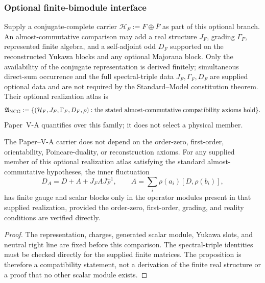 \documentclass[11pt,a4paper]{article}
\begin{document}

\subsubsection{Optional finite-bimodule interface}
\label{p5:subsec:ncg-assumption-discharge}

\begin{definition}
\label{p5:def:born-hopf-finite-spectral-datum}
Supply a conjugate-complete carrier
\(\mathcal H_F:=F\oplus\bar F\) as part of this optional branch.  An
almost-commutative comparison may
add a real structure \(J_F\), grading \(\Gamma_F\), represented finite algebra,
and a self-adjoint odd \(D_F\) supported on the reconstructed Yukawa blocks
and any optional Majorana block.  Only the availability of the conjugate
representation is derived finitely; simultaneous direct-sum occurrence and
the full spectral-triple data \(J_F,\Gamma_F,D_F\) are supplied optional data
and are not required by the Standard--Model constitution theorem.  Their
optional realization atlas
is
\[
\mathfrak A_{\rm NCG}
:=\{(\mathcal H_F,J_F,\Gamma_F,D_F,\rho):
\text{the stated almost-commutative compatibility axioms hold}\}.
\]
Paper~V-A quantifies over this family; it does not select a physical member.
\end{definition}

\begin{proposition}
\label{p5:thm:ncg-finite-input-discharge}
\label{p5:thm:born-hopf-inner-fluctuations}
The Paper--V-A carrier does not depend on the order-zero, first-order,
orientability, Poincare-duality, or reconstruction axioms.  For any supplied member of this optional realization atlas satisfying the standard almost-commutative hypotheses, the inner
fluctuation
\[
D_A=D+A+J_FAJ_F^{-1},
\qquad
A=\sum_i\rho(a_i)[D,\rho(b_i)],
\]
has finite gauge and scalar blocks only in the operator modules present in
that supplied realization, provided the order-zero, first-order, grading, and
reality conditions are verified directly.
\end{proposition}

\begin{proof}
The representation, charges, generated scalar module, Yukawa slots, and
neutral right line are fixed before this comparison.  The spectral-triple
identities must be checked directly for the supplied finite matrices.  The
proposition is therefore a compatibility statement, not a derivation of the
finite real structure or a proof that no other scalar module exists.
\end{proof}
\end{document}
